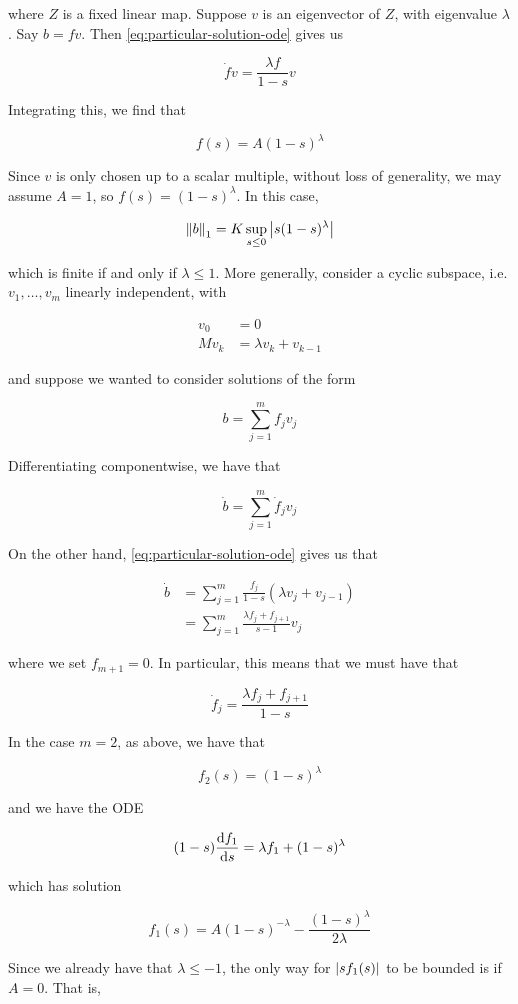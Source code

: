 \documentclass{report}
\begin{document}
where \(Z\) is a fixed linear map. Suppose \(v\) is an eigenvector of \(Z\), with eigenvalue \(\lambda\). Say \(b = fv\). Then \cref{eq:particular-solution-ode} gives us

\[\dot f v = \frac{\lambda f}{1-s}v\]

Integrating this, we find that

\[f(s) = A(1-s)^\lambda\]

Since \(v\) is only chosen up to a scalar multiple, without loss of generality, we may assume \(A = 1\), so \(f(s) = (1-s)^\lambda\). In this case,

\[\norm{b}_1 = K\sup_{s \le 0}\abs{s(1-s)^\lambda}\]

which is finite if and only if \(\lambda \le 1\). More generally, consider a cyclic subspace, i.e. \(v_1, \dots, v_m\) linearly independent, with

\begin{align*}
    v_0 &= 0 \\
    Mv_k &= \lambda v_k + v_{k-1}
\end{align*}

and suppose we wanted to consider solutions of the form

\[b = \sum_{j=1}^m f_jv_j\]

Differentiating componentwise, we have that

\[\dot b = \sum_{j=1}^m \dot f_jv_j\]

On the other hand, \cref{eq:particular-solution-ode} gives us that

\begin{align*}
    \dot b &= \sum_{j=1}^m \frac{f_j}{1-s}(\lambda v_j + v_{j-1}) \\
    &= \sum_{j=1}^m\frac{\lambda f_j + f_{j+1}}{s-1}v_j
\end{align*}

where we set \(f_{m+1} = 0\). In particular, this means that we must have that

\[\dot f_j = \frac{\lambda f_j + f_{j+1}}{1-s}\]

In the case \(m = 2\), as above, we have that

\[f_2(s) = (1-s)^\lambda\]

and we have the ODE

\[(1-s)\dv{f_1}{s} = \lambda f_1 + (1-s)^\lambda\]

which has solution

\[f_1(s) = A(1-s)^{-\lambda} - \frac{(1-s)^\lambda}{2\lambda}\]

Since we already have that \(\lambda \le -1\), the only way for \(\abs{s f_1(s)}\) to be bounded is if \(A = 0\). That is,
\end{document}
